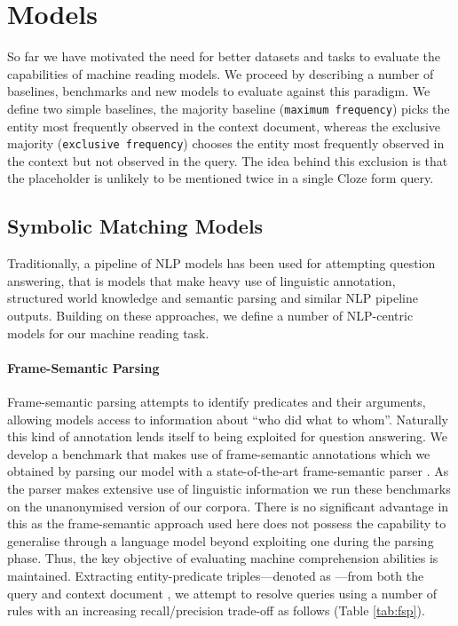 \documentclass{article}
\begin{document}
 \section{Models}
\label{models}

So far we have motivated the need for better datasets and tasks to evaluate the
capabilities of machine reading models. We proceed by describing a number of
baselines, benchmarks and new models to evaluate against this paradigm.  We
define two simple baselines, the majority baseline ({\tt maximum frequency})
picks the entity most frequently observed in the context document, whereas the
exclusive majority ({\tt exclusive frequency}) chooses the entity most
frequently observed in the context but not observed in the query. The idea
behind this exclusion is that the placeholder is unlikely to be mentioned twice
in a single Cloze form query.

\subsection{Symbolic Matching Models}

Traditionally, a pipeline of NLP models has been used for attempting question
answering, that is models that make heavy use of linguistic annotation,
structured world knowledge and semantic parsing and similar NLP pipeline
outputs.
Building on these approaches, we define a number of NLP-centric models for our
machine reading task.

\paragraph{Frame-Semantic Parsing}

Frame-semantic parsing attempts to identify predicates and their arguments,
allowing models access to information about ``who did what to whom''. Naturally
this kind of annotation lends itself to being exploited for question answering.
We develop a benchmark that makes use of frame-semantic annotations
which we obtained by parsing our model with a state-of-the-art frame-semantic
parser \cite{Das:2013:SRL,Hermann:2014:SRL}. As the parser makes extensive use
of linguistic information we run these benchmarks on the unanonymised version of
our corpora. There is no significant advantage in this as the frame-semantic
approach used here does not possess the capability to generalise through a
language model beyond exploiting one during the parsing phase.
Thus, the key objective of evaluating machine comprehension abilities is
maintained. Extracting entity-predicate triples---denoted as
---from both the query  and context document , we attempt to
resolve queries using a number of rules with an increasing recall/precision
trade-off as follows (Table \ref{tab:fsp}).
\end{document}
